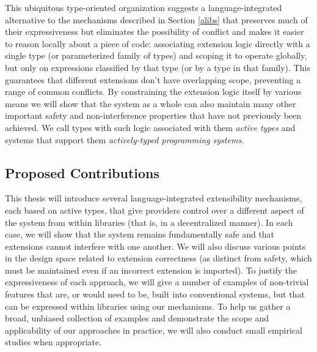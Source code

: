 This ubiquitous type-oriented organization suggests a language-integrated alternative to the mechanisms described in Section \ref{alibs} that preserves much of their expressiveness but eliminates the possibility of conflict and makes it easier to reason locally about a piece of code: associating extension logic directly with a single type (or parameterized family of types) and scoping it to operate globally, but only on expressions classified by that type (or by a type in that family). This guarantees that different extensions don't have overlapping scope, preventing a range of common conflicts. By constraining the extension logic itself by various means we will show that the system as a whole can also maintain many other important safety and non-interference properties that have not previously been achieved. We call types with such logic associated with them \emph{active types} and systems that support them \emph{actively-typed programming systems}. 

\subsection{Proposed Contributions}
This thesis will introduce several language-integrated extensibility mechanisms, each based on active types, that give providers control over a different aspect of the system from within libraries (that is, in a decentralized manner). In each case, we will show that the system remains fundamentally safe and that extensions cannot interfere with one another. We will also discuss various points in the design space related to extension correctness (as distinct from safety, which must be maintained even if an incorrect extension is imported). To justify the  expressiveness of each approach, we will give a number of examples of non-trivial features that are, or would need to be, built into conventional systems, but that can be expressed within libraries using our mechanisms. To help us gather a broad, unbiased collection of examples and demonstrate the scope and applicability of our approaches in practice, we will also conduct small empirical studies when appropriate.


